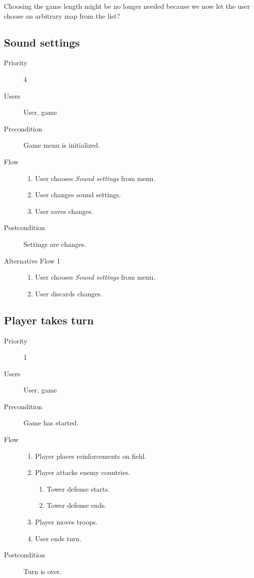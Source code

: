 \documentclass[12pt,a4paper]{article}
\begin{document}
\begin{todo}
  Choosing the game length might be no longer needed because we now let
  the user choose an arbitrary map from the list?
\end{todo}

\subsection{Sound settings}
\begin{description}
\item[Priority] 4
\item[Users] User, game
\item[Precondition] Game menu is initialized.
\item[Flow]\mbox{}
  \begin{enumerate}
  \item User chooses \emph{Sound settings} from menu.
  \item User changes sound settings.
  \item User saves changes.
  \end{enumerate}
\item[Postcondition] Settings are changes. 
\item[Alternative Flow 1]\mbox{}
  \begin{enumerate}
  \item User chooses \emph{Sound settings} from menu.
  \item User discards changes.
  \end{enumerate}
\end{description}

\subsection{Player takes turn}

\begin{description}
\item[Priority] 1
\item[Users] User, game
\item[Precondition] Game has started.
\item[Flow]\mbox{}
  \begin{enumerate}
  \item Player places reinforcements on field.
  \item Player attacks enemy countries.
    \begin{enumerate}
    \item Tower defense starts.
    \item Tower defense ends.
    \end{enumerate}
  \item Player moves troops.
  \item User ends turn.
  \end{enumerate}
\item[Postcondition] Turn is over.
\end{description}
\end{document}
